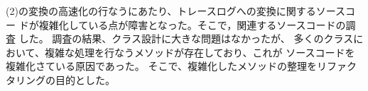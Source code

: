 \documentclass[a4paper,12pt]{jarticle}
\begin{document}
{%





(2)の変換の高速化の行なうにあたり、トレースログへの変換に関するソースコー
ドが複雑化している点が障害となった。そこで，関連するソースコードの調査
した。
調査の結果、クラス設計に大きな問題はなかったが、
多くのクラスにおいて、複雑な処理を行なうメソッドが存在しており、これが
ソースコードを複雑化さている原因であった。
そこで、複雑化したメソッドの整理をリファクタリングの目的とした。



}
\end{document}
